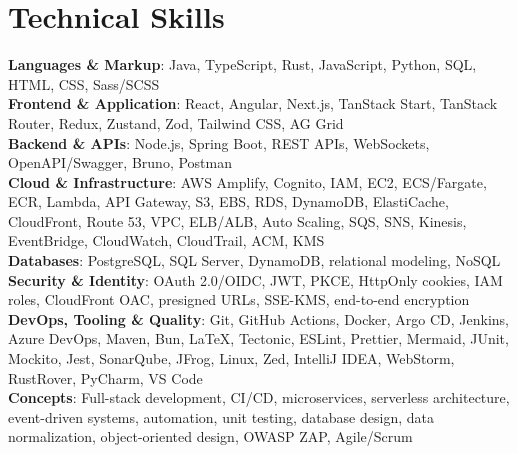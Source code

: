 \section{Technical Skills}
\begin{itemize}[leftmargin=0.15in, label={}]
  \small{\item{
    \textbf{Languages \& Markup}{: Java, TypeScript, Rust, JavaScript, Python, SQL, HTML, CSS, Sass/SCSS} \\
    \textbf{Frontend \& Application}{: React, Angular, Next.js, TanStack Start, TanStack Router, Redux, Zustand, Zod, Tailwind CSS, AG Grid} \\
    \textbf{Backend \& APIs}{: Node.js, Spring Boot, REST APIs, WebSockets, OpenAPI/Swagger, Bruno, Postman} \\
    \textbf{Cloud \& Infrastructure}{: AWS Amplify, Cognito, IAM, EC2, ECS/Fargate, ECR, Lambda, API Gateway, S3, EBS, RDS, DynamoDB, ElastiCache, CloudFront, Route 53, VPC, ELB/ALB, Auto Scaling, SQS, SNS, Kinesis, EventBridge, CloudWatch, CloudTrail, ACM, KMS} \\
    \textbf{Databases}{: PostgreSQL, SQL Server, DynamoDB, relational modeling, NoSQL} \\
    \textbf{Security \& Identity}{: OAuth 2.0/OIDC, JWT, PKCE, HttpOnly cookies, IAM roles, CloudFront OAC, presigned URLs, SSE-KMS, end-to-end encryption} \\
    \textbf{DevOps, Tooling \& Quality}{: Git, GitHub Actions, Docker, Argo CD, Jenkins, Azure DevOps, Maven, Bun, LaTeX, Tectonic, ESLint, Prettier, Mermaid, JUnit, Mockito, Jest, SonarQube, JFrog, Linux, Zed, IntelliJ IDEA, WebStorm, RustRover, PyCharm, VS Code} \\
    \textbf{Concepts}{: Full-stack development, CI/CD, microservices, serverless architecture, event-driven systems, automation, unit testing, database design, data normalization, object-oriented design, OWASP ZAP, Agile/Scrum}
  }}
\end{itemize}
